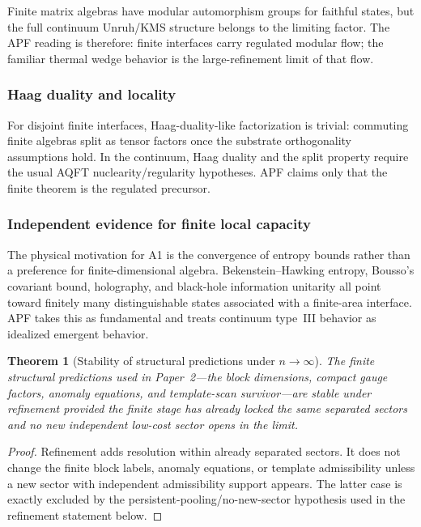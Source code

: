 \documentclass[11pt]{article}
\newtheorem{theorem}{Theorem}[section]
\theoremstyle{definition}
\begin{document}
Finite matrix algebras have modular automorphism groups for faithful
states, but the full continuum Unruh/KMS structure belongs to the limiting
factor.  The APF reading is therefore: finite interfaces carry regulated
modular flow; the familiar thermal wedge behavior is the large-refinement
limit of that flow.

\subsubsection{Haag duality and locality}
\label{sec:haag_duality}

For disjoint finite interfaces, Haag-duality-like factorization is trivial:
commuting finite algebras split as tensor factors once the substrate
orthogonality assumptions hold.  In the continuum, Haag duality and the
split property require the usual AQFT nuclearity/regularity hypotheses.
APF claims only that the finite theorem is the regulated precursor.

\subsubsection{Independent evidence for finite local capacity}
\label{sec:independent_evidence}

The physical motivation for A1 is the convergence of entropy bounds rather
than a preference for finite-dimensional algebra.  Bekenstein--Hawking
entropy, Bousso's covariant bound, holography, and black-hole information
unitarity all point toward finitely many distinguishable states associated
with a finite-area interface.  APF takes this as fundamental and treats
continuum type~III behavior as idealized emergent behavior.

\begin{theorem}[Stability of structural predictions under
$n \to \infty$]\label{thm:structural_stability}
The finite structural predictions used in Paper~2---the block dimensions,
compact gauge factors, anomaly equations, and template-scan survivor---are
stable under refinement provided the finite stage has already locked the
same separated sectors and no new independent low-cost sector opens in the
limit.
\end{theorem}

\begin{proof}
Refinement adds resolution within already separated sectors.  It does not
change the finite block labels, anomaly equations, or template admissibility
unless a new sector with independent admissibility support appears.  The
latter case is exactly excluded by the persistent-pooling/no-new-sector
hypothesis used in the refinement statement below.
\end{proof}
\end{document}
